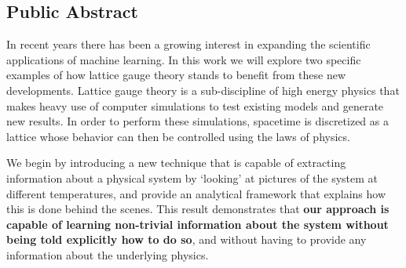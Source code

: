 \begin{doublespace}
\chapter*{Public Abstract}
In recent years there has been a growing interest in expanding the scientific applications of machine learning.
%
In this work we will explore two specific examples of how lattice gauge theory stands to benefit from these new
developments.
%
Lattice gauge theory is a sub-discipline of high energy physics that makes heavy use of computer simulations to test
existing models and generate new results.
%
%
In order to perform these simulations, spacetime is discretized as a lattice
whose behavior can then be controlled using the laws of physics.

We begin by introducing a new technique that is capable of extracting
information about a physical system by `looking' at pictures of the system at
different temperatures, and provide an analytical framework that explains how
this is done behind the scenes.
%
This result demonstrates that \textbf{our approach is capable of learning
non-trivial information about the system without being told explicitly how to
do so}, and without having to provide any information about the underlying
physics.
%


\end{doublespace}
